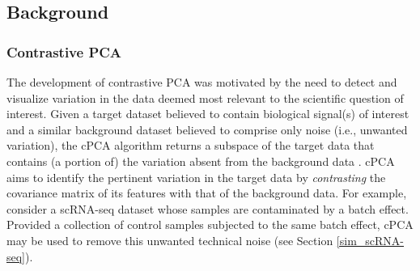 \subsection{Background}\label{back}


\subsubsection{Contrastive PCA}\label{cpca}

The development of contrastive PCA was motivated by the need to detect and visualize variation in the data deemed most relevant to the scientific question of interest. Given a target dataset believed to contain biological signal(s) of interest and a similar background dataset believed to comprise only noise (i.e., unwanted variation), the cPCA algorithm returns a subspace of the target data that contains (a portion of) the variation absent from the background data \citep{Abid2018}. cPCA aims to identify the pertinent variation in the target data by \textit{contrasting} the covariance matrix of its features with that of the background data. For example, consider a scRNA-seq dataset whose samples are contaminated by a batch effect. Provided a collection of control samples subjected to the same batch effect, cPCA may be used to remove this unwanted technical noise (see Section \ref{sim_scRNA-seq}).

